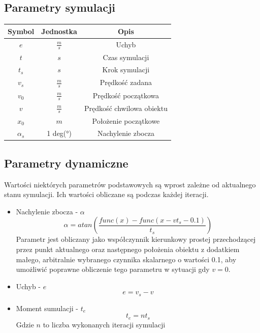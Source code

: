 \documentclass[12pt,a4paper]{article}
\begin{document}
	\subsection{Parametry symulacji}
	\begin{center}
		\begin{tabular}{|c|c|c|}
			\hline
			Symbol & Jednostka & Opis \\
			\hline
			\hline
			$e$ & $\frac{m}{s}$ & Uchyb \\
			\hline
			$t$ & $s$ & Czas symulacji \\
			\hline
			$t_s$ & $s$ & Krok symulacji \\
			\hline
			$v_s$ & $\frac{m}{s}$ & Prędkość zadana \\
			\hline
			$v_0$ & $\frac{m}{s}$ & Prędkość początkowa \\
			\hline
			$v$ & $\frac{m}{s}$ & Prędkość chwilowa obiektu \\
			\hline
			$x_0$ & $m$ & Położenie początkowe \\
			\hline
			$\alpha_s$ & 1 deg(°) & Nachylenie zbocza \\
			\hline
		\end{tabular}
	\end{center}
	
	\subsection{Parametry dynamiczne}
	Wartości niektórych parametrów podstawowych są wprost zależne od aktualnego stanu symulacji. Ich wartości obliczane są podczas każdej iteracji.
	
	\begin{itemize}
		\item Nachylenie zbocza - $\alpha$ \\
		\[
		\alpha = atan \left( \frac{func(x) - func(x - vt_s - 0.1)}{t_s} \right)
		\]
		Parametr jest obliczany jako współczynnik kierunkowy prostej przechodzącej przez punkt aktualnego oraz następnego położenia obiektu z dodatkiem małego, arbitralnie wybranego czynnika skalarnego o wartości 0.1, aby umożliwić poprawne obliczenie tego parametru w sytuacji gdy $v = 0$.
		\item Uchyb - $e$
		\[
			e = v_s - v
		\]
		\item Moment sumulacji - $t_e$
		\[
			t_e = n t_s
		\]
		Gdzie $n$ to liczba wykonanych iteracji symulacji
	\end{itemize}
	
\end{document}
